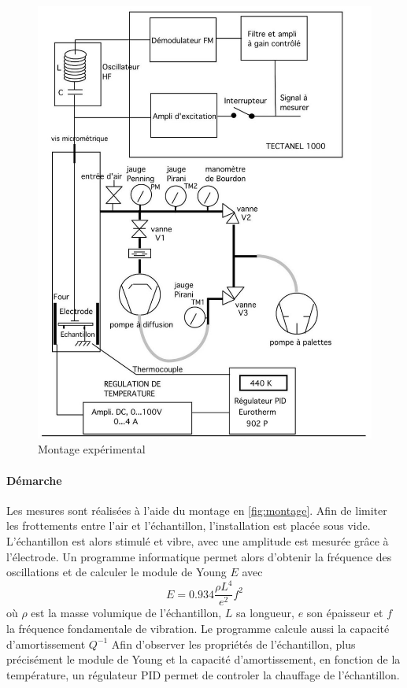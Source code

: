 
\begin{figure}
    \centering
    \includegraphics[width=\linewidth]{figures/montage.png}
    \caption{Montage expérimental \cite{notice}}
    \label{fig:montage}
\end{figure}

\paragraph{Démarche} Les mesures sont réalisées à l'aide du montage en \autoref{fig:montage}. Afin de limiter les frottements entre l'air et l'échantillon, l'installation est placée sous vide. L'échantillon est alors stimulé et vibre, avec une amplitude est mesurée grâce à l'électrode. Un programme informatique permet alors d'obtenir la fréquence des oscillations et de calculer le module de Young \(E\) avec
\begin{equation}
    E = 0.934 \frac{\rho L^4}{e^2}f^2
\end{equation}
où \(\rho\) est la masse volumique de l'échantillon, \(L\) sa longueur, \(e\) son épaisseur et \(f\) la fréquence fondamentale de vibration. Le programme calcule aussi la capacité d'amortissement \(Q^{-1}\)
Afin d'observer les propriétés de l'échantillon, plus précisément le module de Young et la capacité d'amortissement, en fonction de la température, un régulateur PID permet de controler la chauffage de l'échantillon.
